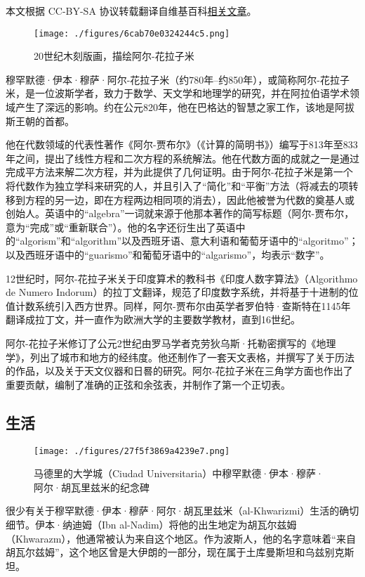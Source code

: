 
本文根据 CC-BY-SA 协议转载翻译自维基百科\href{https://en.wikipedia.org/wiki/Al-Khwarizmi}{相关文章}。
\begin{figure}[ht]
\centering
\texttt{[image: ./figures/6cab70e0324244c5.png]}
\caption{20世纪木刻版画，描绘阿尔-花拉子米} \label{fig_HLZM_1}
\end{figure}
穆罕默德·伊本·穆萨·阿尔-花拉子米（约780年–约850年），或简称阿尔-花拉子米，是一位波斯学者，致力于数学、天文学和地理学的研究，并在阿拉伯语学术领域产生了深远的影响。约在公元820年，他在巴格达的智慧之家工作，该地是阿拔斯王朝的首都。

他在代数领域的代表性著作《阿尔-贾布尔》（《计算的简明书》）编写于813年至833年之间，提出了线性方程和二次方程的系统解法。他在代数方面的成就之一是通过完成平方法来解二次方程，并为此提供了几何证明。由于阿尔-花拉子米是第一个将代数作为独立学科来研究的人，并且引入了“简化”和“平衡”方法（将减去的项转移到方程的另一边，即在方程两边相同项的消去），因此他被誉为代数的奠基人或创始人。英语中的“algebra”一词就来源于他那本著作的简写标题（阿尔-贾布尔，意为“完成”或“重新联合”）。他的名字还衍生出了英语中的“algorism”和“algorithm”以及西班牙语、意大利语和葡萄牙语中的“algoritmo”；以及西班牙语中的“guarismo”和葡萄牙语中的“algarismo”，均表示“数字”。

12世纪时，阿尔-花拉子米关于印度算术的教科书《印度人数字算法》（Algorithmo de Numero Indorum）的拉丁文翻译，规范了印度数字系统，并将基于十进制的位值计数系统引入西方世界。同样，阿尔-贾布尔由英学者罗伯特·查斯特在1145年翻译成拉丁文，并一直作为欧洲大学的主要数学教材，直到16世纪。

阿尔-花拉子米修订了公元2世纪由罗马学者克劳狄乌斯·托勒密撰写的《地理学》，列出了城市和地方的经纬度。他还制作了一套天文表格，并撰写了关于历法的作品，以及关于天文仪器和日晷的研究。阿尔-花拉子米在三角学方面也作出了重要贡献，编制了准确的正弦和余弦表，并制作了第一个正切表。
\subsection{生活}
\begin{figure}[ht]
\centering
\texttt{[image: ./figures/27f5f3869a4239e7.png]}
\caption{马德里的大学城（Ciudad Universitaria）中穆罕默德·伊本·穆萨·阿尔·胡瓦里兹米的纪念碑} \label{fig_HLZM_2}
\end{figure}
很少有关于穆罕默德·伊本·穆萨·阿尔·胡瓦里兹米（al-Khwarizmi）生活的确切细节。伊本·纳迪姆（Ibn al-Nadim）将他的出生地定为胡瓦尔兹姆（Khwarazm），他通常被认为来自这个地区。作为波斯人，他的名字意味着“来自胡瓦尔兹姆”，这个地区曾是大伊朗的一部分，现在属于土库曼斯坦和乌兹别克斯坦。

